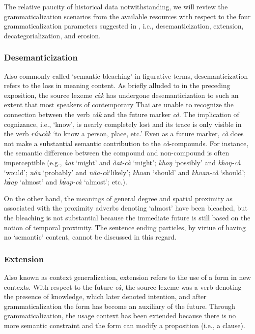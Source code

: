 \documentclass[output=paper,colorlinks,citecolor=brown]{langscibook}
\begin{document}
The relative paucity of historical data notwithstanding, we will review the grammaticalization scenarios from the available resources with respect to the four grammaticalization parameters suggested in \citet[]{Kuteva2019}, i.e., desemanticization, extension, decategorialization, and erosion. 


\subsubsection{Desemanticization}\label{sec:khammee:3.3.1}

Also commonly called ‘semantic bleaching’ in figurative terms, desemanticization refers to the loss in meaning content. As briefly alluded to in the preceding exposition, the source lexeme \textit{càk }has undergone desemanticization to such an extent that most speakers of contemporary Thai are unable to recognize the connection between the verb \textit{càk }and the future marker \textit{cà}. The implication of cognizance, i.e., ‘know’, is nearly completely lost and its trace is only visible in the verb \textit{rúucàk} ‘to know a person, place, etc.’ Even as a future marker, \textit{cà} does not make a substantial semantic contribution to the \textit{cà}-compounds. For instance, the semantic difference between the compound and non-compound is often imperceptible (e.g., \textit{àat} ‘might’ and \textit{àat-cà} ‘might’; \textit{khoŋ} ‘possibly’ and \textit{khoŋ-cà} ‘would’; \textit{nâa} ‘probably’ and \textit{nâa-cà}‘likely’; \textit{khua}n ‘should’ and\textit{ khuan-cà }‘should’; \textit{kʉ̀ap} ‘almost’ and \textit{kʉ̀ap-cà} ‘almost’; etc.). 

On the other hand, the meanings of general degree and spatial proximity as associated with the proximity adverbs denoting ‘almost’ have been bleached, but the bleaching is not substantial because the immediate future is still based on the notion of temporal proximity. The sentence ending particles, by virtue of having no ‘semantic’ content, cannot be discussed in this regard. 

\subsubsection{Extension}\label{sec:khammee:3.3.2}

Also known as context generalization, extension refers to the use of a form in new contexts. With respect to the future \textit{cà}, the source lexeme was a verb denoting the presence of knowledge, which later denoted intention, and after grammaticalization the form has become an auxiliary of the future. Through grammaticalization, the usage context has been extended because there is no more semantic constraint and the form can modify a proposition (i.e., a clause). 
\end{document}
